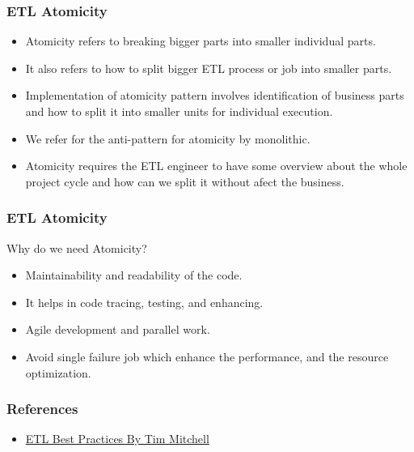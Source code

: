 \begin{frame}
	\frametitle{ETL Atomicity}
	\begin{itemize}[<+->]
		\item Atomicity refers to breaking bigger parts into smaller individual parts.
		\item It also refers to how to split bigger ETL process or job into smaller parts.
		\item Implementation of atomicity pattern involves identification of business parts and how to split it into smaller units for individual execution.
		\item We refer for the anti-pattern for atomicity by monolithic.
		\item Atomicity requires the ETL engineer to have some overview about the whole project cycle and how can we split it without afect the business.
	\end{itemize}
\end{frame}
\begin{frame}
	\frametitle{ETL Atomicity}
	Why do we need Atomicity?
	\begin{itemize}[<+->]
		\item Maintainability and readability of the code.
		\item It helps in code tracing, testing, and enhancing.
		\item Agile development and parallel work.
		\item Avoid single failure job which enhance the performance, and the resource optimization.
	\end{itemize}
\end{frame}

\begin{frame}
	\frametitle{References}
	\begin{itemize}[<+->]
		\item \href{https://www.timmitchell.net/etl-best-practices/}{ETL Best Practices By Tim Mitchell}
	\end{itemize}

\end{frame}






